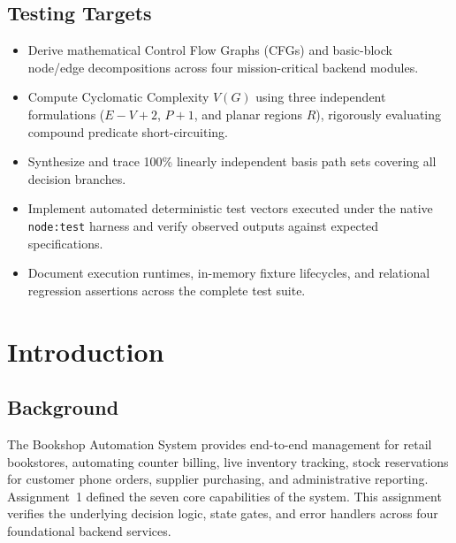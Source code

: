 \documentclass[12pt, a4paper]{report}
\begin{document}
\section*{Testing Targets}
\begin{itemize}[leftmargin=1.5em]
  \item Derive mathematical Control Flow Graphs (CFGs) and basic-block node/edge decompositions across four mission-critical backend modules.
  \item Compute Cyclomatic Complexity $V(G)$ using three independent formulations ($E - V + 2$, $P + 1$, and planar regions $R$), rigorously evaluating compound predicate short-circuiting.
  \item Synthesize and trace 100\% linearly independent basis path sets covering all decision branches.
  \item Implement automated deterministic test vectors executed under the native \texttt{node:test} harness and verify observed outputs against expected specifications.
  \item Document execution runtimes, in-memory fixture lifecycles, and relational regression assertions across the complete test suite.
\end{itemize}

\chapter{Introduction}

\section{Background}
The Bookshop Automation System provides end-to-end management for retail bookstores, automating counter billing, live inventory tracking, stock reservations for customer phone orders, supplier purchasing, and administrative reporting. Assignment~1 defined the seven core capabilities of the system. This assignment verifies the underlying decision logic, state gates, and error handlers across four foundational backend services.
\end{document}
